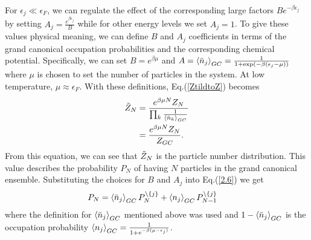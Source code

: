 For $\epsilon_j\ll\epsilon_F$, we can regulate the effect of the corresponding large factors $B e^{-\beta\epsilon_j}$ by setting $A_j=\frac{e^{\beta\epsilon_j}}{B}$ while for other energy levels we set $A_j=1$. To give these values physical meaning, we can define $B$ and $A_j$ coefficients in terms of the grand canonical occupation probabilities and the corresponding chemical potential. Specifically, we can set $B=e^{\beta\mu}$ and $A=\left<{\bar{n}_j}\right>_{GC}=\frac{1}{1+\exp(-\beta(\epsilon_j-\mu))}$ where $\mu$ is chosen to set the number of particles in the system. At low temperature, $\mu\approx\epsilon_F$. With these definitions, Eq.\@ (\ref{ZtildtoZ}) becomes 
\begin{align}
    \Tilde{Z}_N&=\frac{e^{\beta\mu N} Z_N}{\prod_k \frac{1}{\left<{\bar{n}_k}\right>_{GC}}}\nonumber\\
    &=\frac{e^{\beta\mu N} Z_N}{Z_{GC}}. \label{partnum}
\end{align}
From this equation, we can see that $\Tilde{Z}_N$ is the particle number distribution. This value describes the probability $P_N$ of having $N$ particles in the grand canonical ensemble. Substituting the choices for $B$ and $A_j$ into Eq.\@ (\ref{2.6}) we get
\begin{align}
    P_N&=\left<{\bar{n}_j}\right>_{GC}  P_N^{\backslash\{j\}}+ \left<{n_j}\right>_{GC} P_{N-1}^{\backslash\{j\}} \label{recursiontopb}
\end{align}
where the definition for $\left<{\bar{n}_j}\right>_{GC}$ mentioned above was used and $1-\left<{\bar{n}_j}\right>_{GC}$ is the occupation probability $\left<{n_j}\right>_{GC}=\frac{1}{1+e^{-\beta(\mu-\epsilon_j)}}$.

